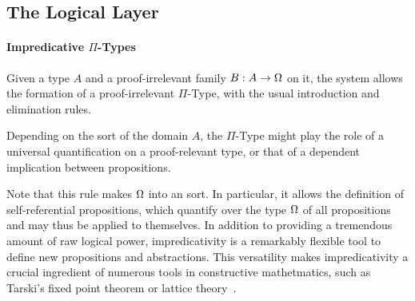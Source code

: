 \subsection{The Logical Layer}

\paragraph*{Impredicative \( \Pi \)-Types}

Given a type \( A \) and a proof-irrelevant family \( B : A \to \Omega \)
on it, the system allows the formation of a proof-irrelevant \( \Pi \)-Type, 
with the usual introduction and elimination rules.
% 
% 
Depending on the sort of the domain \( A \), the \( \Pi \)-Type might play 
the role of a universal quantification on a proof-relevant type, or that of 
a dependent implication between propositions.

Note that this rule makes \( \Omega \) into an 
sort.
% 
In particular, it allows the definition of self-referential propositions,
which quantify over the type \( \Omega \) of all propositions and may thus
be applied to themselves.
%
In addition to providing a tremendous amount of raw logical power, 
impredicativity is a remarkably flexible tool to define new propositions and
abstractions.
% 
This versatility makes impredicativity a crucial ingredient of numerous 
tools in constructive mathetmatics, such as Tarski's fixed point theorem or 
lattice theory~.

